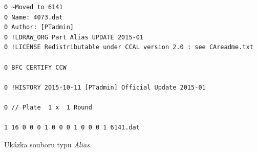       \begin{listing}[htbp]
        \begin{verbatim}
0 ~Moved to 6141
0 Name: 4073.dat
0 Author: [PTadmin]
0 !LDRAW_ORG Part Alias UPDATE 2015-01
0 !LICENSE Redistributable under CCAL version 2.0 : see CAreadme.txt

0 BFC CERTIFY CCW

0 !HISTORY 2015-10-11 [PTadmin] Official Update 2015-01

0 // Plate  1 x  1 Round

1 16 0 0 0 1 0 0 0 1 0 0 0 1 6141.dat
        \end{verbatim}
        \caption{Ukázka souboru typu \textit{Alias} \autocite{ldraw:model:alias}\label{ukazka-alias}}
    \end{listing}

